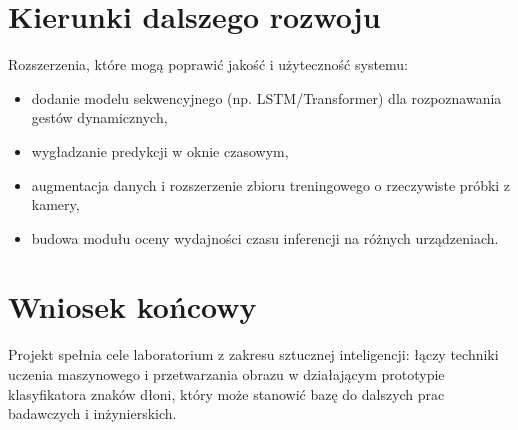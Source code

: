 \section{Kierunki dalszego rozwoju}
\label{sec:dalszy_rozwoj}

Rozszerzenia, które mogą poprawić jakość i użyteczność systemu:
\begin{itemize}
    \item dodanie modelu sekwencyjnego (np. LSTM/Transformer) dla rozpoznawania
          gestów dynamicznych,
    \item wygładzanie predykcji w oknie czasowym,
    \item augmentacja danych i rozszerzenie zbioru treningowego o rzeczywiste
          próbki z kamery,
    \item budowa modułu oceny wydajności czasu inferencji na różnych urządzeniach.
\end{itemize}

\section{Wniosek końcowy}
\label{sec:wniosek_koncowy}

Projekt spełnia cele laboratorium z zakresu sztucznej inteligencji:
łączy techniki uczenia maszynowego i przetwarzania obrazu w działającym
prototypie klasyfikatora znaków dłoni, który może stanowić bazę do
dalszych prac badawczych i inżynierskich.
